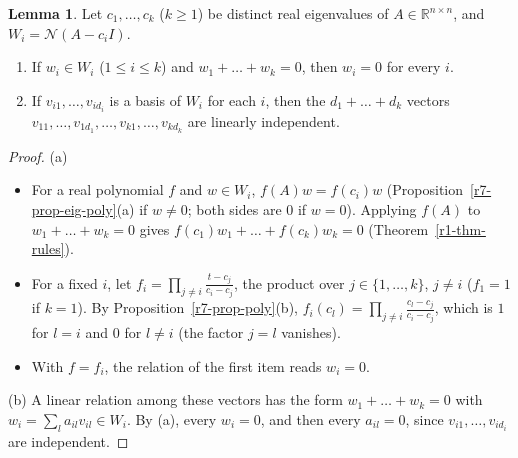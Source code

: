 \documentclass[12pt]{article}
\newcommand{\R}{\mathbb R}
\theoremstyle{definition}
\newtheorem{lemma}[theorem]{Lemma}
\begin{document}
\begin{lemma}\label{r7-lem-eigenspaces}
Let \(c_1,\dots,c_k\) (\(k\geqslant1\)) be distinct real eigenvalues of \(A\in\R^{n\times n}\), and
\(W_i=\mathcal N(A-c_iI)\).
\begin{enumerate}
\item If \(w_i\in W_i\) (\(1\leqslant i\leqslant k\)) and \(w_1+\dots+w_k=0\), then \(w_i=0\) for every \(i\).
\item If \(v_{i1},\dots,v_{id_i}\) is a basis of \(W_i\) for each \(i\), then the \(d_1+\dots+d_k\) vectors
\(v_{11},\dots,v_{1d_1},\dots,v_{k1},\dots,v_{kd_k}\) are linearly independent.
\end{enumerate}
\end{lemma}
\begin{proof}
(a)
\begin{itemize}
\item For a real polynomial \(f\) and \(w\in W_i\), \(f(A)w=f(c_i)w\) (Proposition~\ref{r7-prop-eig-poly}(a) if \(w\ne0\);
both sides are \(0\) if \(w=0\)). Applying \(f(A)\) to \(w_1+\dots+w_k=0\) gives \(f(c_1)w_1+\dots+f(c_k)w_k=0\)
(Theorem~\ref{r1-thm-rules}).
\item For a fixed \(i\), let \(f_i=\prod_{j\ne i}\frac{t-c_j}{c_i-c_j}\), the product over \(j\in\{1,\dots,k\}\), \(j\ne i\)
(\(f_1=1\) if \(k=1\)). By Proposition~\ref{r7-prop-poly}(b), \(f_i(c_l)=\prod_{j\ne i}\frac{c_l-c_j}{c_i-c_j}\), which is
\(1\) for \(l=i\) and \(0\) for \(l\ne i\) (the factor \(j=l\) vanishes).
\item With \(f=f_i\), the relation of the first item reads \(w_i=0\).
\end{itemize}
(b) A linear relation among these vectors has the form \(w_1+\dots+w_k=0\) with \(w_i=\sum_la_{il}v_{il}\in W_i\). By (a),
every \(w_i=0\), and then every \(a_{il}=0\), since \(v_{i1},\dots,v_{id_i}\) are independent.
\end{proof}
\end{document}
